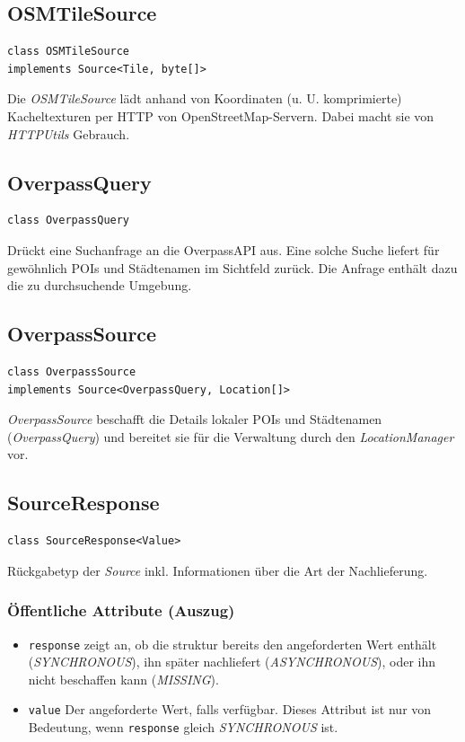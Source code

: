 \documentclass[10pt]{scrreprt}
\begin{document}
\vspace{5mm}
\subsection*{OSMTileSource}
\begin{lstlisting}
class OSMTileSource
implements Source<Tile, byte[]>
\end{lstlisting}
Die \textit{OSMTileSource} lädt anhand von Koordinaten (u. U. komprimierte) Kacheltexturen per HTTP von OpenStreetMap-Servern. Dabei macht sie von \textit{HTTPUtils} Gebrauch.\\

\vspace{5mm}
\subsection*{OverpassQuery}
\begin{lstlisting}
class OverpassQuery
\end{lstlisting}
Drückt eine Suchanfrage an die OverpassAPI aus. Eine solche Suche liefert für gewöhnlich POIs und Städtenamen im Sichtfeld zurück. Die Anfrage enthält dazu die zu durchsuchende Umgebung.\\

\pagebreak
\subsection*{OverpassSource}
\begin{lstlisting}
class OverpassSource
implements Source<OverpassQuery, Location[]>
\end{lstlisting}
\textit{OverpassSource} beschafft die Details lokaler POIs und Städtenamen (\textit{OverpassQuery}) und bereitet sie für die Verwaltung durch den \textit{LocationManager} vor.\\

\vspace{5mm}
\subsection*{SourceResponse}
\begin{lstlisting}
class SourceResponse<Value>
\end{lstlisting}
Rückgabetyp der \textit{Source} inkl. Informationen über die Art der Nachlieferung.\\
\subsubsection*{Öffentliche Attribute (Auszug)}
\begin{itemize}
\item\texttt{response} zeigt an, ob die struktur bereits den angeforderten Wert enthält (\textit{SYNCHRONOUS}), ihn später nachliefert (\textit{ASYNCHRONOUS}), oder ihn nicht beschaffen kann (\textit{MISSING}).
\item\texttt{value} Der angeforderte Wert, falls verfügbar. Dieses Attribut ist nur von Bedeutung, wenn \texttt{response} gleich \textit{SYNCHRONOUS} ist.
\end{itemize}
\end{document}
